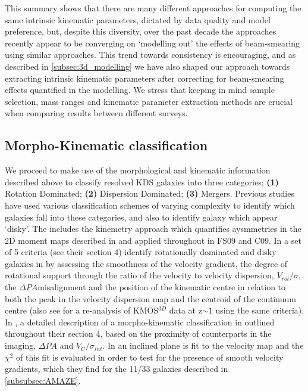 \documentclass[fleqn,usenatbib]{mn2e}
\begin{document}
 
This summary shows that there are many different approaches for computing the same intrinsic kinematic parameters, dictated by data quality and model preference, but, despite this diversity, over the past decade the approaches recently appear to be converging on `modelling out' the effects of beam-smearing using similar approaches.
This trend towards consistency is encouraging, and as described in \cref{subsec:3d_modelling} we have also shaped our approach towards extracting intrinsic kinematic parameters after correcting for beam-smearing effects quantified in the modelling.
We stress that keeping in mind sample selection, mass ranges and kinematic parameter extraction methods are crucial when comparing results between different surveys.

\subsection{Morpho-Kinematic classification}\label{subsec:morpho-kin-class}
We proceed to make use of the morphological and kinematic information described above to classify resolved KDS galaxies into three categories; \textbf{(1)} Rotation Dominated; \textbf{(2)} Dispersion Dominated; \textbf{(3)} Mergers.
Previous studies have used various classification schemes of varying complexity to identify which galaxies fall into these categories, and also to identify galaxy which appear `disky'.
The includes the kinemetry approach which quantifies aysmmetries in the 2D moment maps described in \cite{Shapiro2008} and applied throughout in FS09 and C09.
In \cite{Wisnioski2015} a set of 5 criteria (see their section 4) identify rotationally dominated and disky galaxies in by assessing the smoothness of the velocity gradient, the degree of rotational support through the ratio of the velocity to velocity dispersion, $V_{rot}/\sigma$, the $\Delta PA$misalignment and the position of the kinematic centre in relation to both the peak in the velocity dispersion map and the centroid of the continuum centre (also see \cite{Rodrigues2016} for a re-analysis of KMOS$^{3D}$ data at z$\sim 1$ using the same criteria).   
In \cite{Epinat2012}, a detailed description of a morpho-kinematic classification in outlined throughout their section 4, based on the proximity of counterparts in the imaging, $\Delta PA$ and $V_{C}/\sigma_{int}$.
In \cite{Gnerucci2011} an inclined plane is fit to the velocity map and the $\chi^{2}$ of this fit is evaluated in order to test for the presence of smooth velocity gradients, which they find for the 11/33 galaxies described in \cref{subsubsec:AMAZE}.
\end{document}
